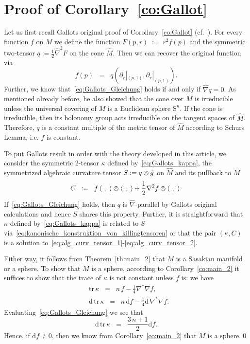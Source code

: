 \documentclass[11pt,a4paper]{article}
\theoremstyle{plain}
\theoremstyle{remark}
\renewcommand{\d}{\mathrm{d}}
\newcommand{\trace}{\mathrm{tr}}
\newcommand{\rmS}{\mathrm{S}}
\begin{document}
\section{Proof of Corollary~\ref{co:Gallot}}
\label{se:Gallot}
Let us first recall Gallots original proof of Corollary~\ref{co:Gallot} (cf.~\cite[Corollary~3.3]{Ga}). For every function $f$ on $M$ we
define the function $F(p,r)\;:=\;r^2 f(p)$ and the symmetric two-tensor $q :=
\frac{1}{2}\hat\nabla^2 F$ on the cone $\hat M$. Then we can recover the original function via 
\begin{equation}\label{eq:kanonische_konstruktion_von_funktionen}
f(p)\;\;=\;\;q(\partial_r|_{(p,1)},\partial_r|_{(p,1)}).
\end{equation}
Further, we know that~\eqref{eq:Gallots_Gleichung} holds if and only if $\hat
\nabla q = 0$. As mentioned already before, he also showed that the cone over
$M$ is irreducible unless the universal covering of $M$ is a Euclidean sphere $\rmS^n$. If the cone is irreducible, then 
its holonomy group acts irreducible on the tangent spaces of $\hat M$. Therefore, $q$ is a constant multiple of the metric tensor of $\hat M$ according to Schurs Lemma, i.e. $f$ is constant.

To put Gallots result in order with the theory developed in this article, we consider the symmetric 2-tensor $\kappa$ defined by~\eqref{eq:Gallots_kappa}, 
the symmetrized algebraic curvature tensor $S := q \owedge \hat g$ on $\hat M$ and its pullback to $M$ 
\begin{equation}
C\;\;:=\;\;f\, \langle\ ,\ \rangle \owedge \langle\ ,\ \rangle + \frac{1}{2}
\nabla^2 f \owedge \langle\ ,\ \rangle.
\end{equation} 
If~\eqref{eq:Gallots_Gleichung} holds, then $q$ is $\hat\nabla$-parallel by Gallots original calculations and hence $S$ shares this property. 
Further, it is straightforward that $\kappa$ defined by~\eqref{eq:Gallots_kappa} is related to $S$ via~\eqref{eq:kanonische_konstruktion_von_killingtensoren} or that 
the pair $(\kappa,C)$ is a solution to~\eqref{eq:alg_curv_tensor_1}-\eqref{eq:alg_curv_tensor_2}. 

Either way, it follows from Theorem~\ref{th:main_2} that $M$ is a Sasakian
manifold or a sphere. To show that $M$ is a sphere, according to Corollary~\ref{co:main_2} it suffices to show that the trace of $\kappa$ is not constant unless $f$ is: we have
\begin{align*}
&\trace \, \kappa\;\;=\;\;n\, f - \frac{1}{4} \nabla^*\nabla f,\\
&\d\, \trace \, \kappa\;\;=\;\;n\, \d f  - \frac{1}{4} \d\, \nabla^*\nabla f.
\end{align*}
Evaluating~\eqref{eq:Gallots_Gleichung} we see that
\[
\d\, \trace \, \kappa\;\;=\;\;\frac{3\, n+1}{2} \d f.
\]
Hence, if $\d f\neq 0$, then we know from Corollary~\ref{co:main_2} that $M$ is a
sphere.\qed
\end{document}
